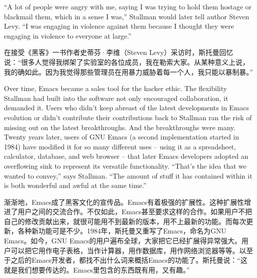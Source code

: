 \ifdefined\eng
``A lot of people were angry with me, saying I was trying to hold them hostage or blackmail them, which in a sense I was,'' Stallman would later tell author Steven Levy. ``I was engaging in violence against them because I thought they were engaging in violence to everyone at large.''
\fi

\ifdefined\chs
在接受《黑客》一书作者史蒂芬·李维（Steven Levy）采访时，斯托曼回忆说：``很多人觉得我绑架了实验室的各位成员，我在勒索大家。从某种意义上说，我的确如此。因为我觉得那些管理员在用暴力威胁着每一个人，我只能以暴制暴。''
\fi

\ifdefined\eng
Over time, Emacs became a sales tool for the hacker ethic. The flexibility Stallman had built into the software not only encouraged collaboration, it demanded it. Users who didn't keep abreast of the latest developments in Emacs evolution or didn't contribute their contributions back to Stallman ran the risk of missing out on the latest breakthroughs. And the breakthroughs were many. Twenty years later, users of GNU Emacs (a second implementation started in 1984) have modified it for so many different uses -- using it as a spreadsheet, calculator, database, and web browser -- that later Emacs developers adopted an overflowing sink to represent its versatile functionality. ``That's the idea that we wanted to convey,'' says Stallman. ``The amount of stuff it has contained within it is both wonderful and awful at the same time.''
\fi

\ifdefined\chs
渐渐地，Emacs成了黑客文化的宣传品。Emacs有着极强的扩展性。这种扩展性增进了用户之间的交流合作。不仅如此，Emacs甚至要求这样的合作。如果用户不把自己的修改贡献出来，就很可能用不到最新的版本，用不上最新的功能。而每次更新，各种新功能可是不少。1984年，斯托曼又重写了Emacs，命名为GNU Emacs。如今，GNU Emacs的用户遍布全球，大家把它已经扩展得异常强大。用户可以把它用作电子表格，当作计算器，用作数据库，用作网络浏览器等等。以至于之后的Emacs开发者，都找不出什么词来概括Emacs的功能了。斯托曼说：``这就是我们想要传达的。Emacs里包含的东西既有用，又有趣。''
\fi

